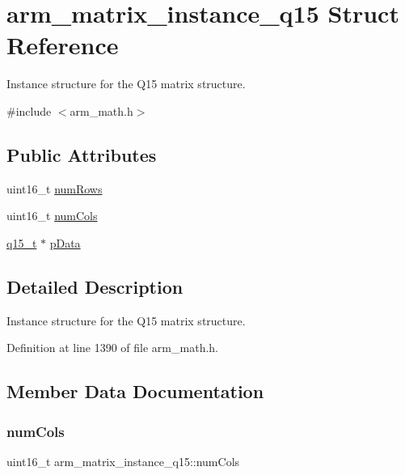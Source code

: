 \hypertarget{structarm__matrix__instance__q15}{}\section{arm\+\_\+matrix\+\_\+instance\+\_\+q15 Struct Reference}
\label{structarm__matrix__instance__q15}


Instance structure for the Q15 matrix structure.  




{\ttfamily \#include $<$arm\+\_\+math.\+h$>$}

\subsection*{Public Attributes}
\begin{DoxyCompactItemize}
\item 
uint16\+\_\+t \hyperlink{structarm__matrix__instance__q15_a9bac6ed54be287c4d4f01a1a28be65f5}{num\+Rows}
\item 
uint16\+\_\+t \hyperlink{structarm__matrix__instance__q15_acbbce67ba058d8e1c867c71d57288c97}{num\+Cols}
\item 
\hyperlink{arm__math_8h_ab5a8fb21a5b3b983d5f54f31614052ea}{q15\+\_\+t} $\ast$ \hyperlink{structarm__matrix__instance__q15_a6da33a5553e634787d0f515cf8d724af}{p\+Data}
\end{DoxyCompactItemize}


\subsection{Detailed Description}
Instance structure for the Q15 matrix structure. 

Definition at line 1390 of file arm\+\_\+math.\+h.



\subsection{Member Data Documentation}
\mbox{\label{structarm__matrix__instance__q15_acbbce67ba058d8e1c867c71d57288c97}} 
\subsubsection{\texorpdfstring{num\+Cols}{numCols}}
{\footnotesize\ttfamily uint16\+\_\+t arm\+\_\+matrix\+\_\+instance\+\_\+q15\+::num\+Cols}

